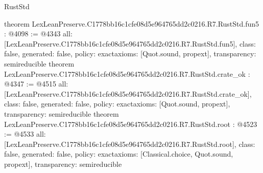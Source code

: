 \begin{lexlean}{RustStd}
\begin{coremodule}
{}
theorem LexLeanPreserve.C1778bb16c1cfe08d5e964765dd2c0216.R7.RustStd.fun5 : @4098 := @4343 {
  all: [LexLeanPreserve.C1778bb16c1cfe08d5e964765dd2c0216.R7.RustStd.fun5],
  class: false,
  generated: false,
  policy: exact{axioms: [Quot.sound, propext]},
  transparency: semireducible
}
theorem LexLeanPreserve.C1778bb16c1cfe08d5e964765dd2c0216.R7.RustStd.crate_ok : @4347 := @4515 {
  all: [LexLeanPreserve.C1778bb16c1cfe08d5e964765dd2c0216.R7.RustStd.crate_ok],
  class: false,
  generated: false,
  policy: exact{axioms: [Quot.sound, propext]},
  transparency: semireducible
}
theorem LexLeanPreserve.C1778bb16c1cfe08d5e964765dd2c0216.R7.RustStd.root : @4523 := @4533 {
  all: [LexLeanPreserve.C1778bb16c1cfe08d5e964765dd2c0216.R7.RustStd.root],
  class: false,
  generated: false,
  policy: exact{axioms: [Classical.choice, Quot.sound, propext]},
  transparency: semireducible
}


\end{coremodule}
\end{lexlean}
